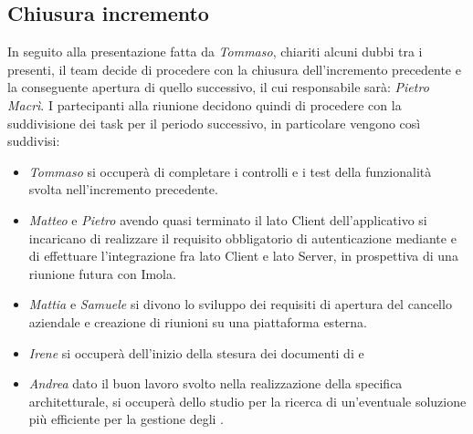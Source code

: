 \subsection{Chiusura incremento}
In seguito alla presentazione fatta da \textit{Tommaso}, chiariti alcuni dubbi tra i presenti, il team decide di procedere con la chiusura dell'incremento precedente e la conseguente apertura di quello successivo, il cui responsabile sarà: \textit{Pietro Macrì}. \newline
I partecipanti alla riunione decidono quindi di procedere con la suddivisione dei task per il periodo successivo, in particolare vengono così suddivisi:
  \begin{itemize}
    \item \textit{Tommaso} si occuperà di completare i controlli e i test della funzionalità svolta nell'incremento precedente.
    \item \textit{Matteo} e \textit{Pietro} avendo quasi terminato il lato Client dell'applicativo si incaricano di realizzare il requisito obbligatorio di autenticazione mediante  e di effettuare l'integrazione fra lato Client e lato Server, in prospettiva di una riunione futura con Imola.
    \item \textit{Mattia} e \textit{Samuele} si divono lo sviluppo dei requisiti di apertura del cancello aziendale e creazione di riunioni su una piattaforma esterna. 
    \item \textit{Irene} si occuperà dell'inizio della stesura dei documenti di  e 
    \item \textit{Andrea} dato il buon lavoro svolto nella realizzazione della specifica architetturale, si occuperà dello studio per la ricerca di un'eventuale  soluzione più efficiente per la gestione degli .
  \end{itemize}
\newpage

